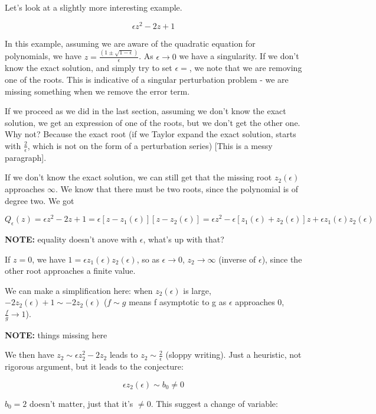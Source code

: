 \documentclass[12pt]{report}
\begin{document}
Let's look at a slightly more interesting example.

\begin{equation}
  \epsilon z^2 - 2z + 1
\end{equation}

In this example, assuming we are aware of the quadratic equation for
polynomials, we have $z = \frac{(1 \pm
  \sqrt{1-\epsilon})}{\epsilon}$. As $\epsilon \to 0$ we have a
singularity. If we don't know the exact solution, and simply try to
set $\epsilon=$, we note that we are removing one of the roots. This
is indicative of a singular perturbation problem - we are missing
something when we remove the error term.

If we proceed as we did in the last section, assuming we don't know
the exact solution, we get an expression of one of the roots, but we
don't get the other one. Why not? Because the exact root (if we Taylor
expand the exact solution, starts with $\frac 2 \epsilon$, which is
not on the form of a perturbation series) [This is a messy paragraph].

If we don't know the exact solution, we can still get that the missing
root $z_2(\epsilon)$ approaches $\infty$. We know that there must be
two roots, since the polynomial is of degree two. We got

$$Q_\epsilon(z) = \epsilon z^2 - 2z +1 = \epsilon[z - z_1(\epsilon)][z
  - z_2(\epsilon)] = \epsilon z^2 - \epsilon [z_1(\epsilon) +
  z_2(\epsilon)]z + \epsilon z_1(\epsilon)z_2(\epsilon)$$

\textbf{NOTE:} equality doesn't anove with $\epsilon$, what's up with
that?

If $z=0$, we have $1 = \epsilon z_1(\epsilon) z_2(\epsilon)$, so as
$\epsilon \to 0$, $z_2 \to \infty$ (inverse of $\epsilon$), since the
other root approaches a finite value.

We can make a simplification here: when $z_2(\epsilon)$ is large, $-2
z_2(\epsilon) + 1 \sim -2 z_2(\epsilon)$ ($f \sim g$ means f
asymptotic to g as $\epsilon$ approaches 0, $\frac f g \to 1$).

\textbf{NOTE: }things missing here

We then have $z_2 \sim \epsilon z_2^2 - 2 z_2$ leads to $z_2 \sim
\frac 2 \epsilon$ (sloppy writing). Just a heuristic, not rigorous
argument, but it leads to the conjecture:

$$\epsilon z_2(\epsilon) \sim b_0 \neq 0$$

$b_0 = 2$ doesn't matter, just that it's $\neq 0$. This suggest a
change of variable:
\end{document}
